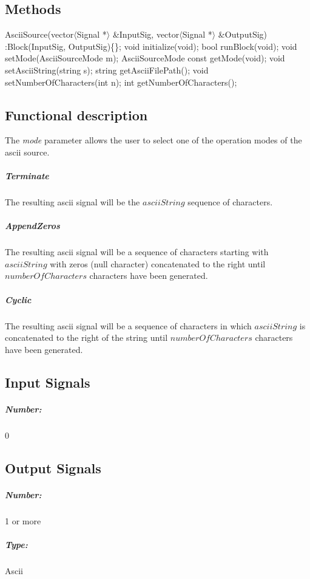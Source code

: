 \subsection*{Methods}

AsciiSource(vector$\langle$Signal *$\rangle$ \&InputSig, vector$\langle$Signal *$\rangle$ \&OutputSig) :Block(InputSig, OutputSig)\{\};
\bigbreak	
void initialize(void);
\bigbreak	
bool runBlock(void);
\bigbreak
void setMode(AsciiSourceMode m);
\bigbreak
AsciiSourceMode const getMode(void);
\bigbreak
void setAsciiString(string s);
\bigbreak
string getAsciiFilePath();
\bigbreak
void setNumberOfCharacters(int n);
\bigbreak
int getNumberOfCharacters();
\bigbreak

\subsection*{Functional description}

The \textit{mode} parameter allows the user to select one of the operation modes of the ascii source.

\subparagraph*{Terminate}
The resulting ascii signal will be the $asciiString$ sequence of characters.

\subparagraph*{AppendZeros}
The resulting ascii signal will be a sequence of characters starting with $asciiString$ with zeros (null character) concatenated to the right until $numberOfCharacters$ characters have been generated.

\subparagraph*{Cyclic}
The resulting ascii signal will be a sequence of characters in which $asciiString$ is concatenated to the right of the string until $numberOfCharacters$ characters have been generated.

\subsection*{Input Signals}

\subparagraph*{Number:} 0

\subsection*{Output Signals}

\subparagraph*{Number:} 1 or more

\subparagraph*{Type:} Ascii

